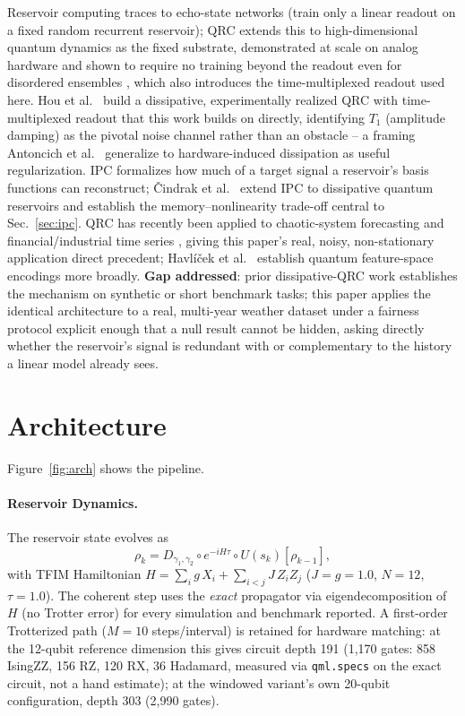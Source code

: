 \documentclass[11pt,twocolumn]{article}
\begin{document}
Reservoir computing traces to echo-state networks \cite{jaeger2001} (train only a linear readout
on a fixed random recurrent reservoir); QRC extends this to high-dimensional quantum dynamics as
the fixed substrate, demonstrated at scale on analog hardware \cite{kornjaca2024} and shown to
require no training beyond the readout even for disordered ensembles \cite{fujii2017}, which also
introduces the time-multiplexed readout used here. Hou et al.\ \cite{hou} build a dissipative,
experimentally realized QRC with time-multiplexed readout that this work builds on directly,
identifying $T_1$ (amplitude damping) as the pivotal noise channel rather than an obstacle -- a
framing Antoncich et al.\ \cite{antoncich} generalize to hardware-induced dissipation as useful
regularization. IPC \cite{dambre2012} formalizes how much of a target signal a reservoir's basis
functions can reconstruct; \v{C}indrak et al.\ \cite{cindrak2026} extend IPC to dissipative
quantum reservoirs and establish the memory--nonlinearity trade-off central to
Sec.~\ref{sec:ipc}. QRC has recently been applied to chaotic-system forecasting \cite{ahmed2025}
and financial/industrial time series \cite{li2025,tandon2025}, giving this paper's real, noisy,
non-stationary application direct precedent; Havl\'{i}\v{c}ek et al.\ \cite{havlicek2019}
establish quantum feature-space encodings more broadly. \textbf{Gap addressed}: prior
dissipative-QRC work establishes the mechanism on synthetic or short benchmark tasks; this paper
applies the identical architecture to a real, multi-year weather dataset under a fairness
protocol explicit enough that a null result cannot be hidden, asking directly whether the
reservoir's signal is redundant with or complementary to the history a linear model already sees.

\section{Architecture}
\label{sec:arch}

Figure~\ref{fig:arch} shows the pipeline.

\paragraph{Reservoir Dynamics.}

The reservoir state evolves as
\begin{equation}
\rho_k = D_{\gamma_1,\gamma_2} \circ e^{-iH\tau} \circ U(s_k)[\rho_{k-1}],
\end{equation}
with TFIM Hamiltonian $H = \sum_i g\,X_i + \sum_{i<j} J\,Z_iZ_j$ ($J{=}g{=}1.0$, $N{=}12$,
$\tau{=}1.0$). The coherent step uses the \emph{exact} propagator via eigendecomposition of $H$
(no Trotter error) for every simulation and benchmark reported. A first-order Trotterized path
($M{=}10$ steps/interval) is retained for hardware matching: at the 12-qubit reference dimension
this gives circuit depth 191 (1{,}170 gates: 858 IsingZZ, 156 RZ, 120 RX, 36 Hadamard, measured via
\texttt{qml.specs} on the exact circuit, not a hand estimate); at the windowed variant's own
20-qubit configuration, depth 303 (2{,}990 gates).
\end{document}
